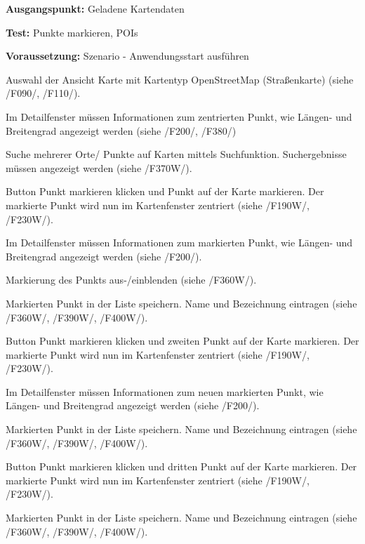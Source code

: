 \documentclass[10pt]{scrreprt}
\newenvironment{details}[1][6pt]{%
  \parskip#1 \parindent6mm \raggedright%
  \def\item{\par\ignorespaces\hangindent=5mm \hangafter1}}{%
  \par\ignorespaces}
\newcommand{\sfbf}[1]{\textbf{\sffamily #1}}
\newcommand{\ziel}[1]{{\fontsize{9.5}{11}\textsf{/#1/}}}
\newcommand{\ziellabel}{Z}
\newcommand{\wunsch}{\renewcommand{\labelenumi}{\textbf{\ziel{\ziellabel\numprint{\theenumi}0W}}}}
\begin{document}
\vspace{1.0cm}
\begin{details}[2pt]
\item \sfbf{Ausgangspunkt:} Geladene Kartendaten 
\item \sfbf{Test:} Punkte markieren, POIs 
\item \sfbf{Voraussetzung:} Szenario - Anwendungsstart ausführen
\end{details}
\vspace{2mm}
\begin{enumerate}[leftmargin = 2.2cm, resume]
\item Auswahl der Ansicht Karte mit Kartentyp OpenStreetMap (Straßenkarte) (siehe \ziel{F090}, \ziel{F110}).
\item Im Detailfenster müssen Informationen zum zentrierten Punkt, wie Längen- und Breitengrad angezeigt werden (siehe \ziel{F200}, \ziel{F380})
\wunsch
\item Suche mehrerer Orte/ Punkte auf Karten mittels Suchfunktion. Suchergebnisse müssen angezeigt werden (siehe \ziel{F370W}).
\item Button Punkt markieren klicken und Punkt auf der Karte markieren. Der markierte Punkt wird nun im Kartenfenster zentriert (siehe \ziel{F190W}, \ziel{F230W}).
\item Im Detailfenster müssen Informationen zum markierten Punkt, wie Längen- und Breitengrad angezeigt werden (siehe \ziel{F200}).
\item Markierung des Punkts aus-/einblenden (siehe \ziel{F360W}).
\item Markierten Punkt in der Liste speichern. Name und Bezeichnung eintragen (siehe \ziel{F360W}, \ziel{F390W}, \ziel{F400W}).
\item Button Punkt markieren klicken und zweiten Punkt auf der Karte markieren. Der markierte Punkt wird nun im Kartenfenster zentriert (siehe \ziel{F190W}, \ziel{F230W}).
\item Im Detailfenster müssen Informationen zum neuen markierten Punkt, wie Längen- und Breitengrad angezeigt werden (siehe \ziel{F200}).
\item Markierten Punkt in der Liste speichern. Name und Bezeichnung eintragen (siehe \ziel{F360W}, \ziel{F390W}, \ziel{F400W}).
\item Button Punkt markieren klicken und dritten Punkt auf der Karte markieren. Der markierte Punkt wird nun im Kartenfenster zentriert (siehe \ziel{F190W}, \ziel{F230W}).
\item Markierten Punkt in der Liste speichern. Name und Bezeichnung eintragen (siehe \ziel{F360W}, \ziel{F390W}, \ziel{F400W}).

\end{enumerate}
\end{document}
